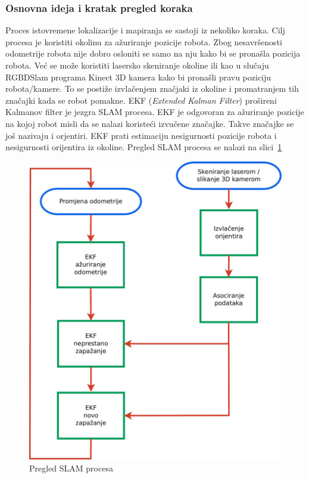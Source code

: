 \subsubsection{Osnovna ideja i kratak pregled koraka} %
\label{ssub:Osnovna ideja }
Proces istovremene lokalizacije i mapiranja se sastoji iz nekoliko
koraka. Cilj procesa je koristiti okolinu za ažuriranje pozicije robota.
Zbog nesavršenosti odometrije robota nije dobro osloniti se samo na nju
kako bi se pronašla pozicija robota. Već se može koristiti lasersko
skeniranje okoline ili kao u slučaju RGBDSlam programa Kinect 3D kamera
kako bi pronašli pravu poziciju robota/kamere. To se postiže
izvlačenjem značjaki iz okoline i promatranjem tih značajki kada se
robot pomakne. EKF (\textit{Extended Kalman Filter}) prošireni Kalmanov
filter je jezgra SLAM procesa. EKF je odgovoran za ažuriranje pozicije
na kojoj robot misli da se nalazi koristeći izvučene značajke. Takve
značajke se još nazivaju i orjentiri. EKF prati estimaciju nesigurnosti
pozicije robota i nesigurnosti orijentira iz okoline. Pregled SLAM
procesa se nalazi na slici~\ref{fig:slam-overview.pdf}

\begin{figure}[h]
\renewcommand{\figurename}{Grafikon}
\centering
\includegraphics[scale=0.43]{figures/slam-overview.pdf}
\caption[]{Pregled SLAM procesa\footnotemark[1]}
\label{fig:slam-overview.pdf}
\end{figure}

